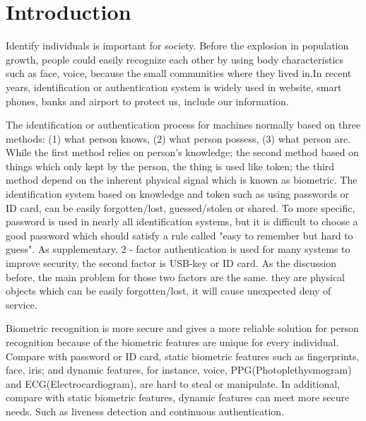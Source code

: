 \documentclass[a4paper,12pt]{article}
\begin{document}

\clearpage
\tableofcontents\label{c}

\clearpage
\section{Introduction}\label{Introduction}
Identify individuals is important for society. Before the explosion in population growth, people could easily recognize each other by using body characteristics such as face, voice, because the small communities where they lived in\parencite{Jain:2011bio}.In recent years, identification or authentication system is widely used in website, smart phones, banks and airport to protect us, include our information\parencite{Pinto:2018evolution}. 

The identification or authentication process for machines normally based on three methods: (1) what person knows, (2) what person possess, (3) what person are. While the first method relies on person's knowledge; the second method based on things which only kept by the person, the thing is used like token; the third method depend on the inherent physical signal which is known as biometric. The identification system based on knowledge and token such as using passwords or ID card, can be easily forgotten/lost, guessed/stolen or shared\parencite{Jain:2011bio}. To more specific, password is used in nearly all identification systems, but it is difficult to choose a good password which should satisfy a rule called "easy to remember but hard to guess". As supplementary, 2 - factor authentication is used for many systems to improve security, the second factor is USB-key or ID card. As the discussion before, the main problem for those two factors are the same. they are physical objects which can be easily forgotten/lost, it will cause unexpected deny of service\parencite{Blasco:2018feasibility}.

Biometric recognition is more secure and gives a more reliable solution for person recognition because of the biometric features are unique for every individual\parencite{Jain:2011bio}. Compare with password or ID card, static biometric features such as fingerprints, face, iris; and dynamic features, for instance, voice, PPG(Photoplethysmogram) and ECG(Electrocardiogram), are hard to steal or manipulate\parencite{Agrafioti:2011heart}. In additional, compare with static biometric features, dynamic features can meet more secure needs. Such as liveness detection and continuous authentication\parencite{Agrafioti:2011medical}.
\end{document}
